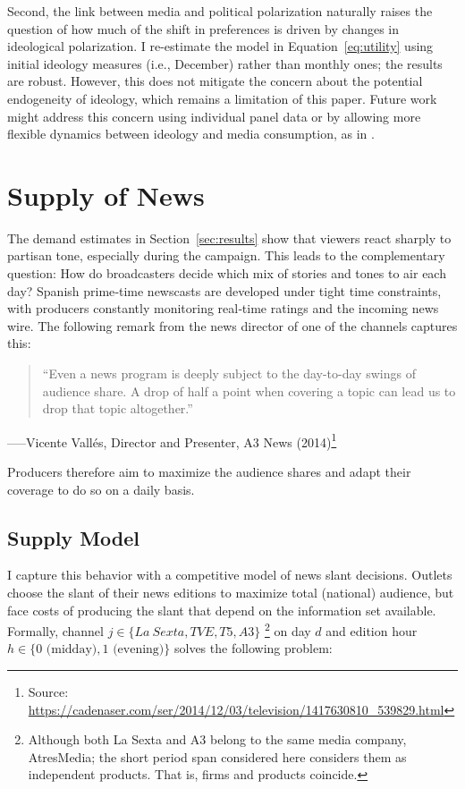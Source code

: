 \documentclass[12pt]{article}
\begin{document}
Second, the link between media and political polarization naturally raises the question of how much of the shift in preferences is driven by changes in ideological polarization. I re-estimate the model in Equation~\eqref{eq:utility} using initial ideology measures (i.e., December) rather than monthly ones; the results are robust. However, this does not mitigate the concern about the potential endogeneity of ideology, which remains a limitation of this paper. Future work might address this concern using individual panel data or by allowing more flexible dynamics between ideology and media consumption, as in \cite{martin2017}.





\section{Supply of News}


\label{sec:supply}



The demand estimates in Section~\ref{sec:results} show that viewers react sharply to
partisan tone, especially during the campaign.  This  leads to the complementary question:
How do broadcasters decide which mix of stories and tones to air each day? 
Spanish prime‑time newscasts are developed under tight time constraints, with producers
constantly monitoring real‑time ratings and the incoming news wire.  
The following remark from the news director of one of the channels captures this: 


\begin{quote}
	“Even a news program is deeply subject to the day-to-day swings of audience share.  
	A drop of half a point when covering a topic can lead us to drop that topic altogether.”
\end{quote}
\hspace*{\fill}–––Vicente Vallés, Director and Presenter, A3 News (2014)\footnote{Source: \url{https://cadenaser.com/ser/2014/12/03/television/1417630810_539829.html}}

Producers therefore aim to maximize the audience shares and adapt their coverage to do so on a daily basis.


\subsection{Supply Model}

I capture this behavior with a competitive model of news slant decisions. Outlets choose the slant of their news editions to maximize total (national) audience, but face costs of producing the slant that depend on the information set available.  Formally, channel $j\in \{La \ Sexta, TVE, T5, A3\}$ \footnote{Although both La Sexta and A3 belong to the same media company, AtresMedia; the short period span considered here considers them as independent products. That is, firms and products coincide. } on day $d$ and edition hour $h\in\{0\text{ (midday)},1\text{ (evening)}\}$ solves the following problem:
\end{document}
